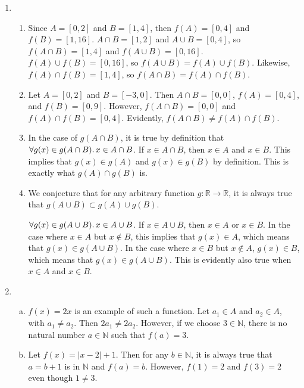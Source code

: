 \documentclass{article}
\begin{document}
\begin{enumerate}
\item 
\begin{enumerate}
	\item Since \(A = [0, 2]\) and \(B = [1, 4]\), then \(f(A) = [0, 4]\) and \(f(B) = [1, 16]\).
	\(A \cap B = [1, 2]\) and \(A \cup B = [0, 4]\), so \(f \left( A \cap B \right) = [1, 4]\)
	and \(f \left(A \cup B \right) = [0, 16]\). \(f(A) \cup f(B) = [0, 16]\), so 
	\(f \left(A \cup B \right) = f(A) \cup f(B)\). Likewise, \(f(A) \cap f(B) = [1, 4]\), so
	\(f \left(A \cap B \right) = f(A) \cap f(B)\). 

	\item Let \(A = [0, 2]\) and \(B = [-3, 0]\). Then \(A \cap B = [0, 0]\), \(f(A) = [0, 4]\),
	and \(f(B) = [0, 9]\). However, \(f(A \cap B) = [0, 0]\) and \(f(A) \cap f(B) = [0, 4]\). 
	Evidently, \(f(A \cap B) \neq f(A) \cap f(B)\). 

	\item In the case of \(g(A \cap B)\), it is true by definition that 
	\(\forall g(x) \in g(A \cap B) \ldotp x \in A \cap B\). If \(x \in A \cap B\),
	then \(x \in A\) and \(x \in B\). This implies that \(g(x) \in g(A)\) and \(g(x) \in g(B)\)
	by definition. This is exactly what \(g(A) \cap g(B)\) is. 

	\item We conjecture that for any arbitrary function \(g : \mathbb{R} \rightarrow \mathbb{R}\),
	it is always true that \(g(A \cup B) \subset g(A) \cup g(B)\). 

	\(\forall g(x) \in g(A \cup B) \ldotp x \in A \cup B\). If \(x \in A \cup B\), then \(x \in A\)
	or \(x \in B\). In the case where \(x \in A\) but \(x \notin B\), this implies that \(g(x) \in A\),
	which means that \(g(x) \in g(A \cup B)\). In the case where \(x \in B\) but \(x \notin A\), 
	\(g(x) \in B\), which means that \(g(x) \in g(A \cup B)\). This is evidently also true when
	\(x \in A\) and \(x \in B\). 
\end{enumerate}

\item 
\begin{enumerate}[(a)]
	\item \(f(x) = 2x\) is an example of such a function. Let \(a_{1} \in A\) and \(a_{2} \in A\), with
	\(a_{1} \neq a_{2}\). Then \(2a_{1} \neq 2a_{2}\). However, if we choose \(3 \in \mathbb{N}\), there
	is no natural number \(a \in \mathbb{N}\) such that \(f(a) = 3\). 

	\item Let \(f(x) = | x - 2 | + 1\). Then for any \(b \in \mathbb{N}\), it is always true that 
	\(a = b + 1\) is in \(\mathbb{N}\) and \(f(a) = b\). However, \(f(1) = 2\) and \(f(3) = 2\) even
	though \(1 \neq 3\). 


\end{enumerate}
\end{enumerate}
\end{document}
